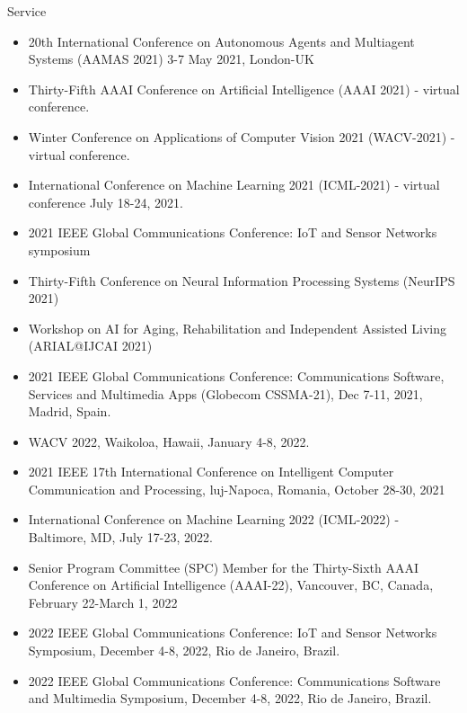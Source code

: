 \begin{category}{Service}
\begin{itemize}
\item 20th International Conference on Autonomous Agents and Multiagent Systems (AAMAS 2021) 3-7 May 2021, London-UK

\item Thirty-Fifth AAAI Conference on Artificial Intelligence (AAAI 2021) - virtual conference.

\item Winter Conference on Applications of Computer Vision 2021 (WACV-2021) - virtual conference.

\item International Conference on Machine Learning 2021 (ICML-2021) - virtual conference July 18-24, 2021.

\item 2021 IEEE Global Communications Conference: IoT and Sensor Networks symposium

\item Thirty-Fifth Conference on Neural Information Processing Systems
(NeurIPS 2021)

\item Workshop on AI for Aging, Rehabilitation and Independent
Assisted Living (ARIAL@IJCAI 2021)

\item 2021 IEEE Global Communications Conference: Communications Software, Services and Multimedia Apps (Globecom CSSMA-21), Dec 7-11, 2021, Madrid, Spain.

\item WACV 2022, Waikoloa, Hawaii, January 4-8, 2022.

\item 2021 IEEE 17th International Conference on Intelligent Computer Communication and Processing, luj-Napoca, Romania, October 28-30, 2021 

\item International Conference on Machine Learning 2022 (ICML-2022) - Baltimore, MD, July 17-23, 2022.

\item Senior Program Committee (SPC) Member for the Thirty-Sixth AAAI Conference on Artificial Intelligence (AAAI-22), Vancouver, BC, Canada, February 22-March 1, 2022

\item 2022 IEEE Global Communications Conference: IoT and Sensor Networks Symposium, December 4-8, 2022, Rio de Janeiro, Brazil.

\item 2022 IEEE Global Communications Conference:  Communications Software and Multimedia Symposium, December 4-8, 2022, Rio de Janeiro, Brazil.


\end{itemize}
\end{category}
